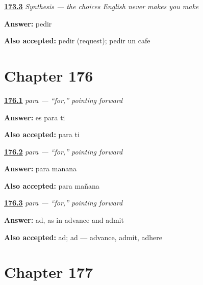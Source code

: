 \noindent\begin{minipage}[t]{\linewidth}
\raggedright
\hyperlink{review-ES-C39-sintesis-elegir-ask}{\textbf{173.3}} \emph{Synthesis — the choices English never makes you make}\par
\small \textbf{Answer:} pedir\par
\footnotesize \textbf{Also accepted:} pedir (request); pedir un cafe
\end{minipage}\par\medskip

\section*{Chapter 176}

\noindent\begin{minipage}[t]{\linewidth}
\raggedright
\hyperlink{review-ES-C51-para-you}{\textbf{176.1}} \emph{para — \textquotedblleft{}for,\textquotedblright{} pointing forward}\par
\small \textbf{Answer:} es para ti\par
\footnotesize \textbf{Also accepted:} para ti
\end{minipage}\par\medskip

\noindent\begin{minipage}[t]{\linewidth}
\raggedright
\hyperlink{review-ES-C51-para-when}{\textbf{176.2}} \emph{para — \textquotedblleft{}for,\textquotedblright{} pointing forward}\par
\small \textbf{Answer:} para manana\par
\footnotesize \textbf{Also accepted:} para mañana
\end{minipage}\par\medskip

\noindent\begin{minipage}[t]{\linewidth}
\raggedright
\hyperlink{review-ES-C51-para-arrow}{\textbf{176.3}} \emph{para — \textquotedblleft{}for,\textquotedblright{} pointing forward}\par
\small \textbf{Answer:} ad, as in advance and admit\par
\footnotesize \textbf{Also accepted:} ad; ad — advance, admit, adhere
\end{minipage}\par\medskip

\section*{Chapter 177}

